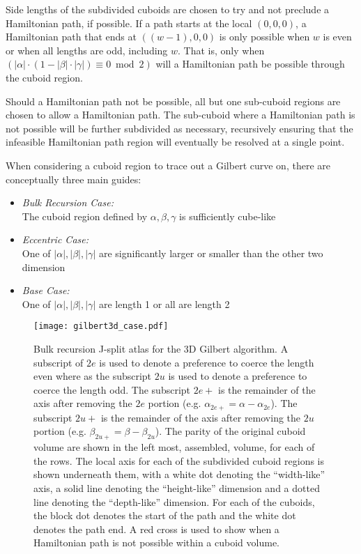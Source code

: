 Side lengths of the subdivided cuboids are chosen to try and not preclude a
Hamiltonian path, if possible.
If a path starts at the local $(0,0,0)$, a Hamiltonian path that ends
at $((w-1),0,0)$ is only possible when $w$ is even or when all lengths are odd, including $w$.
That is, only when $(|\alpha| \cdot ( 1 - |\beta| \cdot |\gamma| ) \equiv 0 \bmod 2)$ will a Hamiltonian
path be possible through the cuboid region.

Should a Hamiltonian path not be possible, all but one sub-cuboid regions are chosen to allow a Hamiltonian
path.
The sub-cuboid where a Hamiltonian path is not possible will be further subdivided as necessary, recursively
ensuring that the infeasible Hamiltonian path region will eventually be resolved at a single point.

When considering a cuboid region to trace out a Gilbert curve on, there are conceptually three main guides:

\begin{itemize}
  \item \textit{Bulk Recursion Case:} \\ The cuboid region defined by $\alpha, \beta, \gamma$ is sufficiently cube-like
  \item \textit{Eccentric Case:} \\ One of $|\alpha|, |\beta|, |\gamma|$ are significantly larger or smaller than the other two dimension
  \item \textit{Base Case:} \\ One of $|\alpha|, |\beta|, |\gamma|$ are length 1 or all are length 2
\end{itemize}


\begin{figure*}[ht]
  \centering
  \texttt{[image: gilbert3d\_case.pdf]}
  \caption{ Bulk recursion J-split atlas for the 3D Gilbert algorithm. A subscript of $2e$ is used to denote a preference
  to coerce the length even where as the subscript $2u$ is used to denote a preference to coerce the length odd.
  The subscript $2e+$ is the remainder of the axis after removing the $2e$ portion (e.g. $\alpha_{2e+} = \alpha - \alpha_{2e}$).
  The subscript $2u+$ is the remainder of the axis after removing the $2u$ portion (e.g. $\beta_{2u+} = \beta - \beta_{2u}$).
  The parity of the original cuboid volume are shown in the left most, assembled, volume, for each of the rows.
  The local axis for each of the subdivided cuboid regions is shown underneath them, with a white dot
  denoting the ``width-like'' axis, a solid line denoting the ``height-like'' dimension and a dotted line
  denoting the ``depth-like'' dimension. For each of the cuboids, the block dot denotes the start of the path
  and the white dot denotes the path end. A red cross is used to show when a Hamiltonian path is not possible within a cuboid volume.  }
  \label{fig:gilbert3DCase}
\end{figure*}


